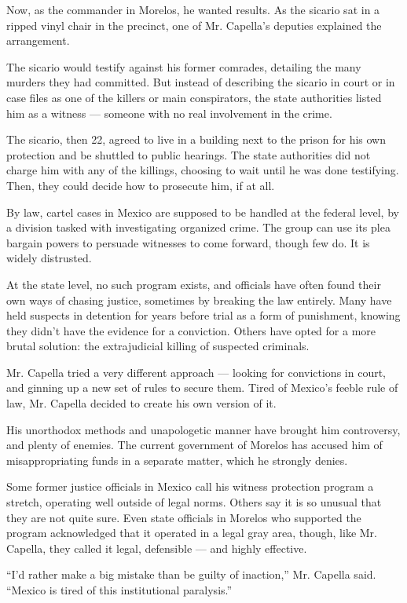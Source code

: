 Now, as the commander in Morelos, he wanted results. As the sicario sat
in a ripped vinyl chair in the precinct, one of Mr. Capella's deputies
explained the arrangement.

The sicario would testify against his former comrades, detailing the
many murders they had committed. But instead of describing the sicario
in court or in case files as one of the killers or main conspirators,
the state authorities listed him as a witness --- someone with no real
involvement in the crime.

The sicario, then 22, agreed to live in a building next to the prison
for his own protection and be shuttled to public hearings. The state
authorities did not charge him with any of the killings, choosing to
wait until he was done testifying. Then, they could decide how to
prosecute him, if at all.

By law, cartel cases in Mexico are supposed to be handled at the federal
level, by a division tasked with investigating organized crime. The
group can use its plea bargain powers to persuade witnesses to come
forward, though few do. It is widely distrusted.

At the state level, no such program exists, and officials have often
found their own ways of chasing justice, sometimes by breaking the law
entirely. Many have held suspects in detention for years before trial as
a form of punishment, knowing they didn't have the evidence for a
conviction. Others have opted for a more brutal solution: the
extrajudicial killing of suspected criminals.

Mr. Capella tried a very different approach --- looking for convictions
in court, and ginning up a new set of rules to secure them. Tired of
Mexico's feeble rule of law, Mr. Capella decided to create his own
version of it.

His unorthodox methods and unapologetic manner have brought him
controversy, and plenty of enemies. The current government of Morelos
has accused him of misappropriating funds in a separate matter, which he
strongly denies.

Some former justice officials in Mexico call his witness protection
program a stretch, operating well outside of legal norms. Others say it
is so unusual that they are not quite sure. Even state officials in
Morelos who supported the program acknowledged that it operated in a
legal gray area, though, like Mr. Capella, they called it legal,
defensible --- and highly effective.

``I'd rather make a big mistake than be guilty of inaction,'' Mr.
Capella said. ``Mexico is tired of this institutional paralysis.''


